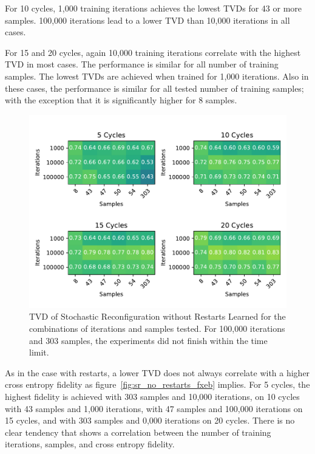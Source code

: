 For 10 cycles, 1,000 training iterations achieves the lowest TVDs for 43 or more samples. 
100,000 iterations lead to a lower TVD than 10,000 iterations in all cases. 

For 15 and 20 cycles, again 10,000 training iterations correlate with the highest TVD in most cases.
The performance is similar for all number of training samples. The lowest TVDs are achieved when trained for 1,000
iterations. Also in these cases, the performance is similar for all tested number of training samples; with 
the exception that it is significantly higher for 8 samples.

\begin{figure}[H]
  \centering
  \includegraphics[width=\textwidth]{figures/results/SR-no-restarts-learned/tvd_heatmap.pdf}
  \caption[TVD of Stochastic Reconfiguration without Restarts Learned]{TVD of Stochastic 
  Reconfiguration without Restarts Learned for the combinations of iterations and samples tested.
  For 100,000 iterations and 303 samples, the experiments did not finish within the time limit.}
  \label{fig:sr_no_restarts_tvd}
\end{figure}

As in the case with restarts, a lower TVD does not always correlate with a higher cross entropy fidelity as 
figure~\ref{fig:sr_no_restarts_fxeb}
implies. For 5 cycles, the highest fidelity is achieved with 303 samples and 10,000 iterations, on 10 cycles 
with 43 samples and 1,000 iterations, with 47 samples and 100,000 iterations on 15 cycles, and with 303 samples and 
0,000 iterations on 20 cycles. There is no clear tendency that shows a correlation between 
the number of training iterations, samples, and cross entropy fidelity.

